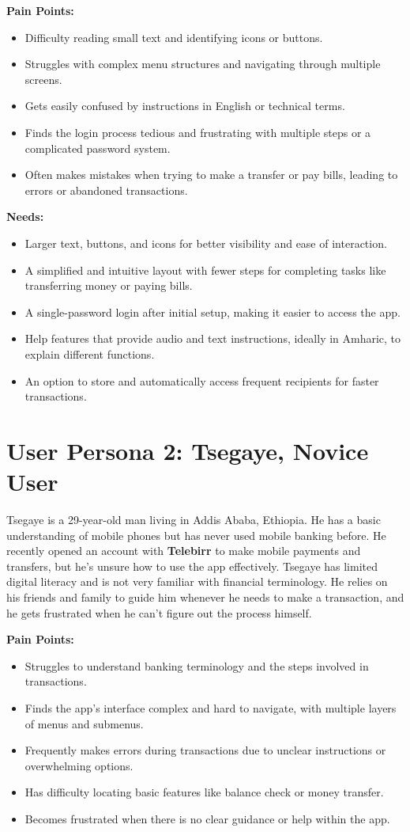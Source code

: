 \documentclass[a4paper,12pt]{report}
\begin{document}
\textbf{Pain Points:}
\begin{itemize}
  \item Difficulty reading small text and identifying icons or buttons.
  \item Struggles with complex menu structures and navigating through multiple screens.
  \item Gets easily confused by instructions in English or technical terms.
  \item Finds the login process tedious and frustrating with multiple steps or a complicated password system.
  \item Often makes mistakes when trying to make a transfer or pay bills, leading to errors or abandoned transactions.
\end{itemize}

\textbf{Needs:}
\begin{itemize}
  \item Larger text, buttons, and icons for better visibility and ease of interaction.
  \item A simplified and intuitive layout with fewer steps for completing tasks like transferring money or paying bills.
  \item A single-password login after initial setup, making it easier to access the app.
  \item Help features that provide audio and text instructions, ideally in Amharic, to explain different functions.
  \item An option to store and automatically access frequent recipients for faster transactions.
\end{itemize}


\section{User Persona 2: Tsegaye, Novice User}

Tsegaye is a 29-year-old man living in Addis Ababa, Ethiopia. He has a basic understanding of mobile phones but has never used mobile banking before. He recently opened an account with \textbf{Telebirr} to make mobile payments and transfers, but he's unsure how to use the app effectively. Tsegaye has limited digital literacy and is not very familiar with financial terminology. He relies on his friends and family to guide him whenever he needs to make a transaction, and he gets frustrated when he can't figure out the process himself.

\textbf{Pain Points:}
\begin{itemize}
  \item Struggles to understand banking terminology and the steps involved in transactions.
  \item Finds the app's interface complex and hard to navigate, with multiple layers of menus and submenus.
  \item Frequently makes errors during transactions due to unclear instructions or overwhelming options.
  \item Has difficulty locating basic features like balance check or money transfer.
  \item Becomes frustrated when there is no clear guidance or help within the app.
\end{itemize}
\end{document}
